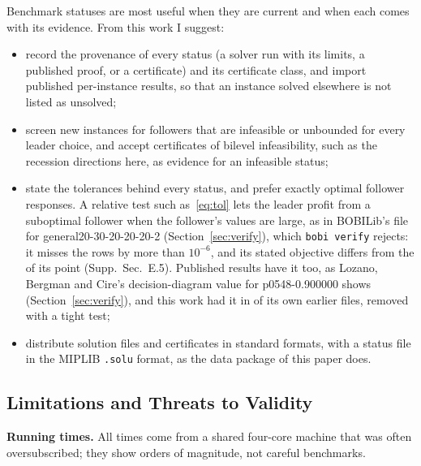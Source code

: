 \documentclass[]{spie}  %
\theoremstyle{plain}
\newcommand{\supp}[1]{Supp.\ Sec.~#1}
\newcommand{\code}[1]{\texttt{#1}}
\newcommand{\inst}[1]{\mbox{#1}}             %
\begin{document}
Benchmark statuses are most useful when they are current and when each comes with its evidence.
From this work I suggest:
\begin{itemize}
\item record the provenance of every status (a solver run with its limits, a published proof, or
a certificate) and its certificate class, and import published per-instance results, so that an
instance solved elsewhere is not listed as unsolved;
\item screen new instances for followers that are infeasible or unbounded for every leader
choice, and accept certificates of bilevel infeasibility, such as the recession directions here,
as evidence for an infeasible status;
\item state the tolerances behind every status, and prefer exactly optimal follower responses.
A relative test such as~\eqref{eq:tol} lets the leader profit from a suboptimal follower when the
follower's values are large, as in BOBILib's file for \inst{general20-30-20-20-20-2}
(Section~\ref{sec:verify}), which \code{bobi verify} rejects: it misses the rows by more than
$10^{-6}$, and its stated objective \GenTolObjFile{} differs from the \GenTolObjComputed{} of its
point (\supp{E.5}). Published results have it too, as Lozano, Bergman and Cire's
decision-diagram value for \inst{p0548-0.900000} shows (Section~\ref{sec:verify}), and this work had
it in \NumTightSupersededBench{} of its own earlier files, removed with a tight test;
\item distribute solution files and certificates in standard formats, with a status file in the
MIPLIB \code{.solu} format, as the data package of this paper does.
\end{itemize}

\subsection{Limitations and Threats to Validity}\label{sec:limits}

\textbf{Running times.} All times come from a shared four-core machine that was often
oversubscribed; they show orders of magnitude, not careful benchmarks.
\end{document}
